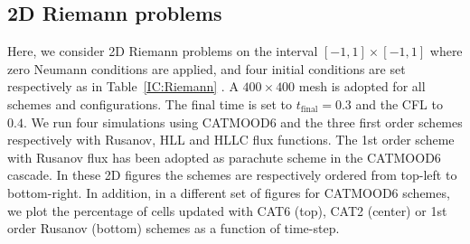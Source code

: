 \subsection{2D Riemann problems} \label{ssec:2DRiemann}
Here, we consider 2D Riemann problems on the interval $[-1,1]\times[-1,1]$ where zero Neumann conditions are applied, and  four initial conditions  are set respectively as in Table~\ref{IC:Riemann} \cite{RP_Schultz93}.
A $400 \times 400$ mesh is adopted for all schemes and configurations. The final time is set to $t_\text{final} = 0.3$ and the CFL to $0.4$.
We run four simulations using CATMOOD6 and the three first order schemes respectively with Rusanov, HLL and HLLC flux functions.
The 1st order scheme with Rusanov flux has been adopted as parachute scheme in the CATMOOD6 cascade.
In these 2D figures the schemes are respectively ordered from top-left to bottom-right.
In addition, in a different set of figures for CATMOOD6 schemes, we plot the percentage of cells updated with CAT6 (top), CAT2 (center) or 1st order Rusanov (bottom) schemes as a function of time-step.
